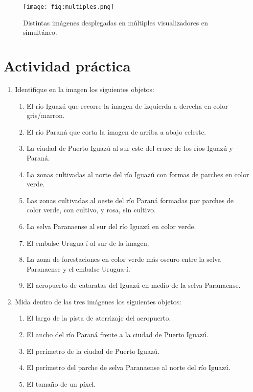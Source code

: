 \begin{figure}[h!]
    \centering
    \texttt{[image: fig:multiples.png]}
    \caption{Distintas imágenes desplegadas en múltiples visualizadores en simultáneo.}
    \label{fig:multiples}
\end{figure}

\section{Actividad práctica}

\begin{enumerate}
  \item Identifique en la imagen los siguientes objetos:
  \begin{enumerate}
    \item El río Iguazú que recorre la imagen de izquierda a derecha en color gris/marron.
    \item El río Paraná que corta la imagen de arriba a abajo celeste.
    \item La ciudad de Puerto Iguazú al sur-este del cruce de los ríos Iguazú y Paraná.
    \item La zonas cultivadas al norte del río Iguazú con formas de parches en color verde.
    \item Las zonas cultivadas al oeste del río Paraná formadas por parches de color verde, con cultivo, y rosa, sin cultivo.
    \item La selva Paranaense al sur del río Iguazú en color verde.
    \item El embalse Urugua-í al sur de la imagen.
    \item La zona de forestaciones en color verde más oscuro entre la selva Paranaense y el embalse Urugua-í.
    \item El aeropuerto de cataratas del Iguazú en medio de la selva Paranaense.
  \end{enumerate}

  \item Mida dentro de las tres imágenes los siguientes objetos:
  \begin{enumerate}
    \item El largo de la pista de aterrizaje del aeropuerto.
    \item El ancho del río Paraná frente a la ciudad de Puerto Iguazú.
    \item El perímetro de la ciudad de Puerto Iguazú.
    \item El perímetro del parche de selva Paranaense al norte del río Iguazú.
    \item El tamaño de un píxel.
  \end{enumerate}


\end{enumerate}
